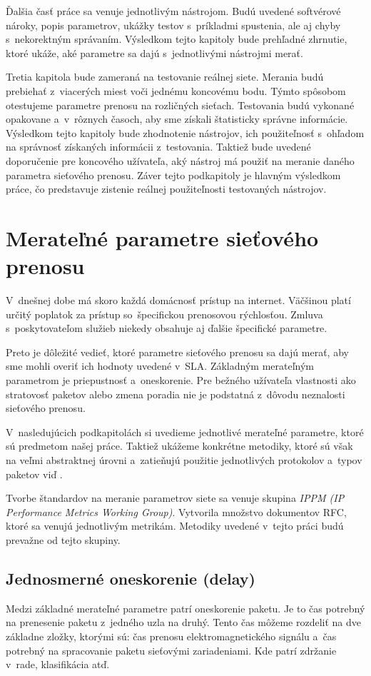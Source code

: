 Ďalšia časť práce sa venuje jednotlivým nástrojom. Budú uvedené softvérové  
nároky, popis parametrov, ukážky testov s~príkladmi spustenia, ale aj chyby
s~nekorektným správaním. Výsledkom tejto kapitoly bude prehľadné
zhrnutie, ktoré ukáže, aké parametre sa dajú s~jednotlivými nástrojmi merať. 

Tretia kapitola bude zameraná na testovanie reálnej siete. 
Merania budú prebiehať z~viacerých miest
voči jednému koncovému bodu. Týmto spôsobom otestujeme parametre
prenosu na rozličných sieťach. Testovania budú vykonané opakovane
a~v~rôznych časoch, aby sme získali štatisticky správne informácie.
Výsledkom tejto kapitoly bude zhodnotenie nástrojov, ich použiteľnosť
s~ohľadom na správnosť získaných informácii z~testovania. Taktiež bude 
uvedené doporučenie pre koncového užívateľa, aký nástroj má použiť na meranie 
daného parametra sieťového prenosu. Záver tejto podkapitoly je hlavným výsledkom
práce, čo predstavuje zistenie reálnej použiteľnosti testovaných nástrojov.

\chapter{Merateľné parametre sieťového prenosu} \label{parametre}
V~dnešnej dobe má skoro každá domácnosť prístup na internet. Väčšinou platí
určitý poplatok za prístup so~špecifickou prenosovou rýchlosťou. Zmluva
s~poskytovateľom služieb niekedy obsahuje aj ďalšie špecifické parametre.

Preto je dôležité vedieť, ktoré parametre sieťového prenosu sa dajú merať, aby
sme mohli overiť ich hodnoty uvedené v~SLA. 
Základným merateľným
parametrom je priepustnosť a~oneskorenie. Pre bežného užívateľa vlastnosti ako 
stratovosť paketov alebo zmena poradia nie je podstatná z~dôvodu 
neznalosti sieťového prenosu.

V~nasledujúcich podkapitolách si uvedieme jednotlivé merateľné parametre, ktoré
sú predmetom našej práce. Taktiež ukážeme konkrétne metodiky, ktoré sú
však na veľmi abstraktnej úrovni a~zatieňujú použitie jednotlivých protokolov
a~typov paketov viď \cite{rfc_perf_metrics}. 

Tvorbe štandardov na meranie
parametrov siete sa venuje skupina \emph{IPPM (IP Performance Metrics
Working Group)}. Vytvorila množstvo dokumentov RFC, ktoré sa venujú
jednotlivým metrikám. Metodiky uvedené v~tejto práci budú prevažne od
tejto skupiny.

\section{Jednosmerné oneskorenie (delay)} \label{delay}
Medzi základné merateľné parametre patrí oneskorenie paketu.
Je to čas potrebný na prenesenie paketu
z~jedného uzla na druhý. Tento čas môžeme rozdeliť na dve základne zložky,
ktorými sú: čas prenosu elektromagnetického signálu a~čas
potrebný na spracovanie paketu sieťovými zariadeniami.
Kde patrí zdržanie v~rade, klasifikácia atď.

